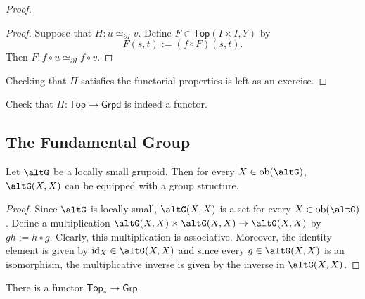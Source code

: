 \begin{proof}
\begin{enumerate}[label = \textit{Step \arabic*:},wide = 0pt, itemsep = 1.5ex]
\begin{itemize}[leftmargin = *]
					\begin{proof}
						Suppose that $H : u \simeq_{\partial I} v$. Define $F \in \mathsf{Top}(I \times I,Y)$ by
						\begin{equation*}
							F(s,t) := (f \circ F)(s,t).
						\end{equation*}
						Then $F : f \circ u \simeq_{\partial I} f \circ v$.
					\end{proof}
			\end{itemize}
	\end{enumerate}
	Checking that $\Pi$ satisfies the functorial properties is left as an exercise.
\end{proof}

\begin{exercise}
	Check that $\Pi : \mathsf{Top} \to \mathsf{Grpd}$ is indeed a functor.
\end{exercise}

\subsection*{The Fundamental Group}

\begin{lemma}
	Let $\mathcal{\altG}$ be a locally small grupoid. Then for every $X \in \ob(\mathcal{\altG})$, $\mathcal{\altG}(X,X)$ can be equipped with a group structure.
	\label{lem:groupoid_group}
\end{lemma}

\begin{proof}
	Since $\mathcal{\altG}$ is locally small, $\mathcal{\altG}(X,X)$ is a set for every $X \in \ob(\mathcal{\altG})$. Define a multiplication $\mathcal{\altG}(X,X) \times \mathcal{\altG}(X,X) \to \mathcal{\altG}(X,X)$ by $gh := h \circ g$. Clearly, this multiplication is associative. Moreover, the identity element is given by $\id_X \in \mathcal{\altG}(X,X)$ and since every $g \in \mathcal{\altG}(X,X)$ is an isomorphism, the multiplicative inverse is given by the inverse in $\mathcal{\altG}(X,X)$. 
\end{proof}

\begin{proposition}
	There is a functor $\mathsf{Top}_\ast \to \mathsf{Grp}$.
\end{proposition}

